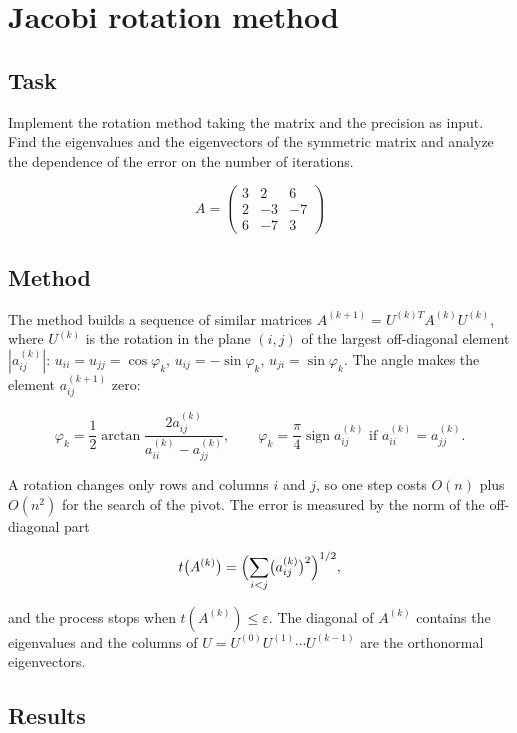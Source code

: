 \section{Jacobi rotation method}

\subsection{Task}

Implement the rotation method taking the matrix and the precision as input. Find the eigenvalues
and the eigenvectors of the symmetric matrix and analyze the dependence of the error on the number
of iterations.

\[
A = \begin{pmatrix}
3 & 2 & 6 \\
2 & -3 & -7 \\
6 & -7 & 3
\end{pmatrix}
\]

\subsection{Method}

The method builds a sequence of similar matrices $A^{(k+1)} = U^{(k)T} A^{(k)} U^{(k)}$, where
$U^{(k)}$ is the rotation in the plane $(i, j)$ of the largest off-diagonal element
$|a_{ij}^{(k)}|$:
$u_{ii} = u_{jj} = \cos\varphi_k$, $u_{ij} = -\sin\varphi_k$, $u_{ji} = \sin\varphi_k$.
The angle makes the element $a_{ij}^{(k+1)}$ zero:

\[
\varphi_k = \frac{1}{2} \arctan \frac{2 a_{ij}^{(k)}}{a_{ii}^{(k)} - a_{jj}^{(k)}},
\qquad
\varphi_k = \frac{\pi}{4} \operatorname{sign} a_{ij}^{(k)} \text{ if } a_{ii}^{(k)} = a_{jj}^{(k)}.
\]

A rotation changes only rows and columns $i$ and $j$, so one step costs $O(n)$ plus $O(n^2)$ for
the search of the pivot. The error is measured by the norm of the off-diagonal part

\[
t\bigl(A^{(k)}\bigr) = \Bigl(\sum_{i<j} \bigl(a_{ij}^{(k)}\bigr)^2\Bigr)^{1/2},
\]

and the process stops when $t(A^{(k)}) \le \varepsilon$. The diagonal of $A^{(k)}$ contains the
eigenvalues and the columns of $U = U^{(0)} U^{(1)} \cdots U^{(k-1)}$ are the orthonormal
eigenvectors.

\subsection{Results}


